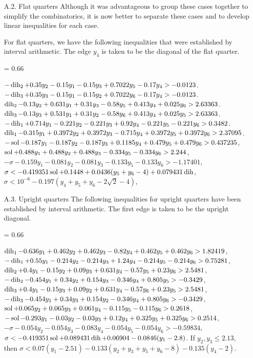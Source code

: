 \smallskip
\subhead A.2. Flat quarters\endsubhead
Although it was advantageous to group these cases together to simplify
the combinatorics, it is now better to separate these cases and to
develop linear inequalities for each case.  

For flat quarters, we have the following inequalities that were
established by interval arithmetic.   The edge $y_4$ is taken
to be the diagonal of the flat quarter.

{
\baselineskip = 0.66\baselineskip
\obeylines
\parskip=0pt
 
\hbox{}

  $-\operatorname{dih}_2+0.35 y_2 - 0.15 y_1 - 0.15 y_3 +0.7022 y_5 - 0.17 y_4 > -0.0123$.
  $-\operatorname{dih}_3+0.35 y_3 - 0.15 y_1 - 0.15 y_2 +0.7022 y_6 - 0.17 y_4 > -0.0123$.
  $\dih_2-0.13 y_2 + 0.631 y_1 + 0.31 y_3 -0.58 y_5+0.413 y_4+0.025 y_6 %
	> 2.63363$.
  $\dih_3-0.13 y_3 +0.531 y_1+0.31 y_2 -0.58y_6+0.413 y_4 +0.025 y_5 %
	> 2.63363$.
 $-\dih_1 +0.714y_1-0.221 y_2-0.221 y_3+0.92 y_4-0.221y_5-0.221 y_6 %
	> 0.3482$.
 $\dih_1-0.315 y_1 +0.3972 y_2 +0.3972 y_3 - 0.715 y_4 +0.3972 y_5 %
	+0.3972 y_6 > 2.37095$.
 $-\sol-0.187 y_1 -0.187 y_2 -0.187 y_3 +0.1185 y_4 + 0.479 y_5 %
	+0.479 y_6 > 0.437235$,
 $\sol+0.488 y_1 + 0.488 y_2 + 0.488 y_3  - 0.334 y_5 %
	-0.334 y_6 > 2.244$,
 $-\sigma -0.159 y_1 - 0.081 y_2 - 0.081 y_3 - 0.133 y_5 - 0.133 y_6 %
	> -1.17401$,
 $\sigma < -0.419351\sol + 0.1448 + 0.0436(y_5+y_6-4) %
	+ 0.079431\dih$,
 $\sigma < 10^{-6} -0.197 (y_4+y_5+y_6-2\sqrt{2}-4)$, 


}

\subhead A.3. Upright quarters\endsubhead
The following inequalities for upright quarters
have been established by interval arithmetic.
The first edge is taken to be the upright diagonal.

\bigskip
{
\baselineskip = 0.66\baselineskip
\obeylines
\parskip=0pt
 
\hbox{}

 $\dih_1 - 0.636 y_1 + 0.462 y_2 + 0.462 y_3 - 0.82 y_4 + 0.462 y_5 %
	+0.462 y_6 > 1.82419$,
 $-\dih_1 + 0.55 y_1 - 0.214 y_2 - 0.214 y_3 + 1.24 y_4 - 0.214 y_5 %
	-0.214 y_6 > 0.75281$,
 $\dih_2 +0.4 y_1 -0.15 y_2 + 0.09 y_3 +0.631 y_4 -0.57 y_5 +0.23 y_6 %
	>2.5481$,
 $-\dih_2-0.454 y_1 + 0.34 y_2 +0.154 y_3 -0.346 y_4 +0.805 y_5 %
	> -0.3429$,
 $\dih_3 +0.4 y_1 -0.15 y_3 + 0.09 y_2 +0.631 y_4 -0.57 y_6 +0.23 y_5 %
	> 2.5481$,
 $-\dih_3 -0.454 y_1 +0.34 y_3 +0.154 y_2 -0.346 y_4 +0.805 y_6 %
	> -0.3429$,
 $\sol +0.065 y_2 + 0.065 y_3 + 0.061 y_4 -0.115 y_5 -0.115 y_6 %
	> 0.2618$,
 $-\sol-0.293 y_1 -0.03 y_2 -0.03 y_3 + 0.12 y_4 +0.325 y_5 +0.325 y_6 %
	> 0.2514$,
 $-\sigma-0.054 y_2 -0.054 y_3 - 0.083 y_4 - 0.054 y_5 -0.054 y_6 %
	> -0.59834$,
 $\sigma < -0.419351\operatorname{sol} + 0.089431\operatorname{dih} +0.06904 -0.0846(y_1-2.8)$.
 If $y_2,y_3\le 2.13$, then $\sigma < 0.07(y_1-2.51) %
	-0.133(y_2+y_3+y_5+y_6-8) - 0.135 (y_4-2)$.

}


